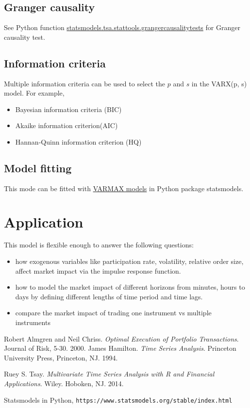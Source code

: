 \documentclass[a4paper]{article}
\begin{document}
\subsection{Granger causality}
See Python function \href{https://www.statsmodels.org/dev/generated/statsmodels.tsa.stattools.grangercausalitytests.html}{statsmodels.tsa.stattools.grangercausalitytests} for Granger causality test.

\subsection{Information criteria}
Multiple information criteria can be used to select the $p$ and $s$ in the VARX(p, s) model. For example,
\begin{itemize}
\item Bayesian information criteria (BIC)
\item Akaike information criterion(AIC)
\item Hannan-Quinn information criterion (HQ)
\end{itemize}

\subsection{Model fitting}
This mode can be fitted with \href{https://www.statsmodels.org/devel/examples/notebooks/generated/statespace_varmax.html}{VARMAX models} in Python package statsmodels.

\section{Application}
This model is flexible enough to answer the following questions:
\begin{itemize}
\item how exogenous variables like participation rate, volatility, relative order size, affect market impact via the impulse response function.
\item how to model the market impact of different horizons from minutes, hours to days by defining different lengths of time period and time lags.
\item compare the market impact of trading one instrument vs multiple instruments
\end{itemize}

\begin{thebibliography}{9}
Robert Almgren and Neil Chriss. 
\textit{Optimal Execution of Portfolio Transactions}. 
Journal of Risk, 5-30. 2000.
James Hamilton. 
\textit{Time Series Analysis}. 
Princeton University Press, Princeton, NJ. 1994.

Ruey S. Tsay. 
\textit{Multivariate Time Series Analysis with R and Financial Applications}. 
Wiley. Hoboken, NJ. 2014.

Statsmodels in Python,
\texttt{https://www.statsmodels.org/stable/index.html}
\end{thebibliography}
\end{document}
